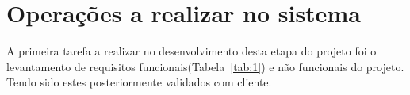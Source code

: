 \section{Operações a realizar no sistema}
A primeira tarefa a realizar no desenvolvimento desta etapa do projeto foi o levantamento de requisitos 
funcionais(Tabela~\ref{tab:1}) e não funcionais do projeto. Tendo sido estes posteriormente validados com 
cliente. 

